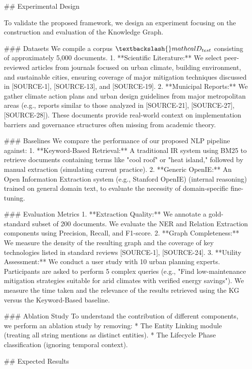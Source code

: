 \documentclass{article}
\begin{document}
\#\# Experimental Design

To validate the proposed framework, we design an experiment focusing on the construction and evaluation of the Knowledge Graph.

\#\#\# Datasets
We compile a corpus $\textbackslash{}mathcal{D}_{test}$ consisting of approximately 5,000 documents.
1.  **Scientific Literature:** We select peer-reviewed articles from journals focused on urban climate, building environment, and sustainable cities, ensuring coverage of major mitigation techniques discussed in [SOURCE-1], [SOURCE-13], and [SOURCE-19].
2.  **Municipal Reports:** We gather climate action plans and urban design guidelines from major metropolitan areas (e.g., reports similar to those analyzed in [SOURCE-21], [SOURCE-27], [SOURCE-28]). These documents provide real-world context on implementation barriers and governance structures often missing from academic theory.

\#\#\# Baselines
We compare the performance of our proposed NLP pipeline against:
1.  **Keyword-Based Retrieval:** A traditional IR system using BM25 to retrieve documents containing terms like "cool roof" or "heat island," followed by manual extraction (simulating current practice).
2.  **Generic OpenIE:** An Open Information Extraction system (e.g., Stanford OpenIE) (internal reasoning) trained on general domain text, to evaluate the necessity of domain-specific fine-tuning.

\#\#\# Evaluation Metrics
1.  **Extraction Quality:** We annotate a gold-standard subset of 200 documents. We evaluate the NER and Relation Extraction components using Precision, Recall, and F1-score.
2.  **Graph Completeness:** We measure the density of the resulting graph and the coverage of key technologies listed in standard reviews [SOURCE-1], [SOURCE-24].
3.  **Utility Assessment:** We conduct a user study with 10 urban planning experts. Participants are asked to perform 5 complex queries (e.g., "Find low-maintenance mitigation strategies suitable for arid climates with verified energy savings"). We measure the time taken and the relevance of the results retrieved using the KG versus the Keyword-Based baseline.

\#\#\# Ablation Study
To understand the contribution of different components, we perform an ablation study by removing:
*   The Entity Linking module (treating all string mentions as distinct entities).
*   The Lifecycle Phase classification (ignoring temporal context).

\#\# Expected Results
\end{document}
